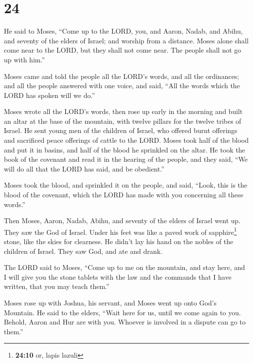 \hypertarget{section-23}{%
\section{24}\label{section-23}}

 He said to Moses, ``Come up to the LORD, you, and Aaron,
Nadab, and Abihu, and seventy of the elders of Israel; and worship from
a distance.  Moses alone shall come near to the LORD, but
they shall not come near. The people shall not go up with him.''

 Moses came and told the people all the LORD's words, and
all the ordinances; and all the people answered with one voice, and
said, ``All the words which the LORD has spoken will we do.''

 Moses wrote all the LORD's words, then rose up early in
the morning and built an altar at the base of the mountain, with twelve
pillars for the twelve tribes of Israel.  He sent young
men of the children of Israel, who offered burnt offerings and
sacrificed peace offerings of cattle to the LORD.  Moses
took half of the blood and put it in basins, and half of the blood he
sprinkled on the altar.  He took the book of the covenant
and read it in the hearing of the people, and they said, ``We will do
all that the LORD has said, and be obedient.''

 Moses took the blood, and sprinkled it on the people, and
said, ``Look, this is the blood of the covenant, which the LORD has made
with you concerning all these words.''

 Then Moses, Aaron, Nadab, Abihu, and seventy of the
elders of Israel went up.  They saw the God of Israel.
Under his feet was like a paved work of sapphire\footnote{\textbf{24:10}
  or, lapis lazuli} stone, like the skies for clearness. 
He didn't lay his hand on the nobles of the children of Israel. They saw
God, and ate and drank.

 The LORD said to Moses, ``Come up to me on the mountain,
and stay here, and I will give you the stone tablets with the law and
the commands that I have written, that you may teach them.''

 Moses rose up with Joshua, his servant, and Moses went
up onto God's Mountain.  He said to the elders, ``Wait
here for us, until we come again to you. Behold, Aaron and Hur are with
you. Whoever is involved in a dispute can go to them.''

